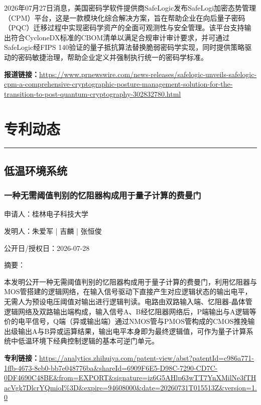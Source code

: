 \documentclass[12pt,a4paper]{ctexart}
\begin{document}
2026年07月27日消息，美国密码学软件提供商SafeLogic发布SafeLogi加密态势管理（CPM）平台，这是一款模块化综合解决方案，旨在帮助企业在向后量子密码（PQC）迁移过程中实现密码学资产的全面可观测性与安全管理。该平台支持输出符合CycloneDX标准的CBOM清单以满足合规审计审计要求，并可通过SafeLogic经FIPS 140验证的量子抵抗算法替换脆弱密码学实现，同时提供策略驱动的密码敏捷治理，帮助企业定义并强制执行统一的密码学标准。

\noindent\textbf{报道链接：}\url{https://www.prnewswire.com/news-releases/safelogic-unveils-safelogic-cpm-a-comprehensive-cryptographic-posture-management-solution-for-the-transition-to-post-quantum-cryptography-302832780.html}



\newpage
\section{专利动态}
\vspace{-0.5em}
\noindent\rule{\linewidth}{1.5pt}

\subsection{ 低温环境系统 }

\subsubsection{ 一种无需阈值判别的忆阻器构成用于量子计算的费曼门 }

申请人：桂林电子科技大学

发明人：朱爱军 | 吉麟 | 张恒俊

公开日/授权日：2026-07-28

摘要：

本发明公开一种无需阈值判别的忆阻器构成用于量子计算的费曼门，利用忆阻器与MOS管搭建的逻辑网络，在输入信号驱动下直接产生对应逻辑状态的输出电平，无需人为预设电压阈值对输出进行逻辑判读。电路由双路输入端、忆阻器‑晶体管逻辑网络及双路输出端构成，输入信号A、B经忆阻器网络后，P端输出与A逻辑等价的电平信号，Q端（异或输出端）通过NMOS管与PMOS管构成的CMOS推挽输出级输出A与B异或运算结果，输出电平本身即为最终逻辑值，可作为量子计算系统中低温环境下经典控制逻辑的基本可逆门单元。

\noindent\textbf{专利链接：}\url{https://analytics.zhihuiya.com/patent-view/abst?patentId=c986a771-1ffb-4673-8eb0-bb7e048776ba&shareId=6909F6E5-D98C-7290-CD7C-0DF4690C48BE&from=EXPORT&signature=iz6G5AHlp63wTT7YnXMilNe3fTHacVgk7DlcrYQmioI%3D&expire=94608000&date=20260731T015513Z&version=1.0}
\end{document}
